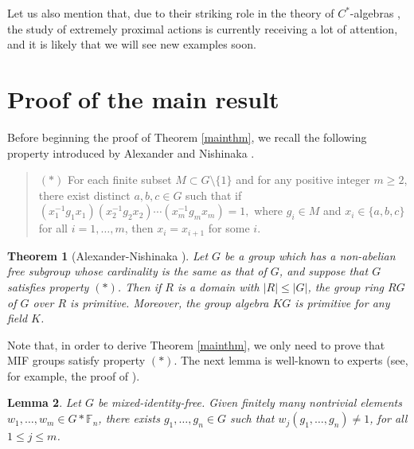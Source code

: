 \documentclass[11pt]{article}
\newtheorem{thm}{Theorem}[section]
\newtheorem{lem}[thm]{Lemma}
\theoremstyle{definition}
\theoremstyle{remark}
\numberwithin{equation}{section}
\numberwithin{equation}{section}
\numberwithin{equation}{section}
\begin{document}
Let us also mention that, due to their striking role in the theory of $C^*$-algebras \cite{Oz25,FKOCP26}, the study of extremely proximal actions is currently receiving a lot of attention, and it is likely that we will see new examples soon. 





\section{Proof of the main result}



Before beginning the proof of Theorem \ref{mainthm}, we recall the following property introduced by Alexander and Nishinaka \cite{AlNi17}.

\begin{quote} $(*)$ For each finite subset $M\subset G\setminus\{1\}$ and for any positive integer $m \geq 2$, there exist distinct $a, b, c \in G$ such that if $(x^{-1}_1g_1x_1)(x^{-1}_2g_2x_2)\cdots(x^{-1}_m g_mx_m) = 1,$ where $g_i \in M$ and
$x_i \in \{a, b, c\}$ for all $i = 1, \ldots , m$, then $x_i = x_{i+1}$ for some $i$.
\end{quote}

\begin{thm}[Alexander-Nishinaka \cite{AlNi17}]\label{AN}
Let $G$ be a group which has a non-abelian free subgroup whose cardinality is the same as that of $G$, and suppose that $G$ satisfies property $(*)$. Then if $R$ is a domain with $|R| \leq |G|$, the group ring $RG$ of $G$ over $R$ is primitive. Moreover, the group algebra $KG$ is primitive for any field $K$.
\end{thm}

Note that, in order to derive Theorem \ref{mainthm}, we only need to prove that MIF groups satisfy property $(*)$. The next lemma is well-known to experts (see, for example, the proof of \cite[Theorem 2.3]{Ch26}). 

\begin{lem}
    Let $G$ be mixed-identity-free. Given finitely many nontrivial elements $w_1,\ldots,w_m\in G*\mathbb F_n$, there exists $g_1,\ldots,g_n\in G$ such that $w_j(g_1,\ldots,g_n)\not=1$, for all $1\leq j\leq m$.
\end{lem}
\end{document}
